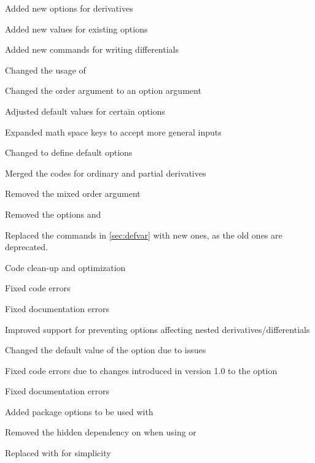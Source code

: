 \begin{changelog}
	\smallskip
	\begin{change}[version=1.0, date=2021-05-25, beta=false]
		\item Added new options for derivatives
		\item Added new values for existing options
		\item Added new commands for writing differentials
		\item Changed the usage of 
		\item Changed the order argument to an option argument
		\item Adjusted default values for certain options
		\item Expanded math space keys to accept more general inputs
		\item Changed  to define default options
		\item Merged the codes for ordinary and partial derivatives
		\item Removed the mixed order argument
		\item Removed the options  and 
		\item Replaced the commands in \cref{sec:defvar} with new ones, as the old ones are deprecated.
		\item Code clean-up and optimization
		\item Fixed code errors
		\item Fixed documentation errors
		\item Improved support for preventing options affecting nested derivatives/differentials
	\end{change}
	\begin{change}[version=1.01, date=2021-05-28, beta=false]
		\item Changed the default value of the option  due to issues
		\item Fixed code errors due to changes introduced in version 1.0 to the option 
		\item Fixed documentation errors
	\end{change}
	\begin{change}[version=1.1, date=2021-06-03, beta=false]
		\item Added package options to be used with 
		\item Removed the hidden dependency on  when using \xetex{} or \luatex
		\item Replaced  with  for simplicity

\end{change}
\end{changelog}
